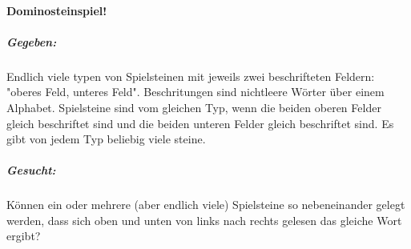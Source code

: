  \paragraph{Dominosteinspiel!}
  \subparagraph{Gegeben: } 
    Endlich viele typen von Spielsteinen mit jeweils zwei beschrifteten Feldern: "oberes Feld, unteres Feld". Beschritungen sind nichtleere Wörter über einem Alphabet. Spielsteine sind vom gleichen Typ, wenn die beiden oberen Felder gleich beschriftet sind und die beiden unteren Felder gleich beschriftet sind. Es gibt von jedem Typ beliebig viele steine. 

  \subparagraph{Gesucht: }
    Können ein oder mehrere (aber endlich viele) Spielsteine so nebeneinander gelegt werden, dass sich oben und unten von links nach rechts gelesen das gleiche Wort ergibt?

